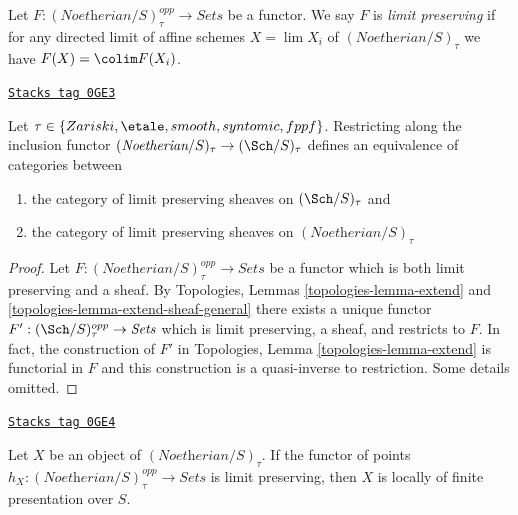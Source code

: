 Let $F : (\textit{Noetherian}/S)_\tau^{opp} \to \textit{Sets}$
be a functor. We say $F$ is {\it limit preserving} if for any
directed limit of affine schemes $X = \lim X_i$ of
$(\textit{Noetherian}/S)_\tau$ we have $F(X) = \colim F(X_i)$.

\begin{lemma}
\label{artin-lemma-canonical-extension}
\href{https://stacks.math.columbia.edu/tag/0GE3}{\texttt{Stacks tag 0GE3}}

Let $\tau \in \{Zariski, \etale, smooth, syntomic, fppf\}$.
Restricting along the inclusion functor
$(\textit{Noetherian}/S)_\tau \to (\Sch/S)_\tau$
defines an equivalence of categories between
\begin{enumerate}
\item the category of limit preserving sheaves on
$(\Sch/S)_\tau$ and
\item the category of limit preserving sheaves on
$(\textit{Noetherian}/S)_\tau$
\end{enumerate}
\end{lemma}

\begin{proof}
Let $F : (\textit{Noetherian}/S)_\tau^{opp} \to \textit{Sets}$
be a functor which is both limit preserving and a sheaf.
By Topologies, Lemmas
\ref{topologies-lemma-extend} and \ref{topologies-lemma-extend-sheaf-general}
there exists a unique functor
$F' : (\Sch/S)_\tau^{opp} \to \textit{Sets}$
which is limit preserving, a sheaf, and restricts to $F$.
In fact, the construction of $F'$ in
Topologies, Lemma \ref{topologies-lemma-extend}
is functorial in $F$ and this construction is a quasi-inverse
to restriction. Some details omitted.
\end{proof}

\begin{lemma}
\label{artin-lemma-representable-limit-preserving}
\href{https://stacks.math.columbia.edu/tag/0GE4}{\texttt{Stacks tag 0GE4}}

Let $X$ be an object of $(\textit{Noetherian}/S)_\tau$. If the functor
of points $h_X : (\textit{Noetherian}/S)_\tau^{opp} \to \textit{Sets}$
is limit preserving, then $X$ is locally of finite presentation over $S$.
\end{lemma}

